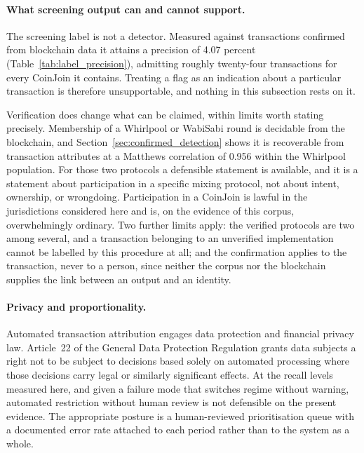 \documentclass[12pt,a4paper]{article}
\begin{document}
\paragraph{What screening output can and cannot support.}
The screening label is not a detector. Measured against
transactions confirmed from blockchain data it attains a
precision of 4.07 percent
(Table~\ref{tab:label_precision}), admitting roughly
twenty-four transactions for every CoinJoin it contains. Treating
a flag as an indication about a particular transaction is
therefore unsupportable, and nothing in this subsection rests on
it.

Verification does change what can be claimed, within limits worth
stating precisely. Membership of a Whirlpool or WabiSabi round is
decidable from the blockchain, and
Section~\ref{sec:confirmed_detection} shows it is recoverable
from transaction attributes at a Matthews correlation of 0.956
within the Whirlpool population. For those two protocols a
defensible statement is available, and it is a statement about
participation in a specific mixing protocol, not about intent,
ownership, or wrongdoing. Participation in a CoinJoin is lawful
in the jurisdictions considered here and is, on the evidence of
this corpus, overwhelmingly ordinary. Two further limits apply:
the verified protocols are two among several, and a transaction
belonging to an unverified implementation cannot be labelled by
this procedure at all; and the confirmation applies to the
transaction, never to a person, since neither the corpus nor the
blockchain supplies the link between an output and an
identity.

\paragraph{Privacy and proportionality.}
Automated transaction attribution engages data protection and
financial privacy law. Article~22 of the General Data Protection
Regulation grants data subjects a right not to be subject to
decisions based solely on automated processing where those
decisions carry legal or similarly significant effects. At the
recall levels measured here, and given a failure mode that
switches regime without warning, automated restriction without
human review is not defensible on the present evidence. The
appropriate posture is a human-reviewed prioritisation queue with
a documented error rate attached to each period rather than to
the system as a whole.
\end{document}

